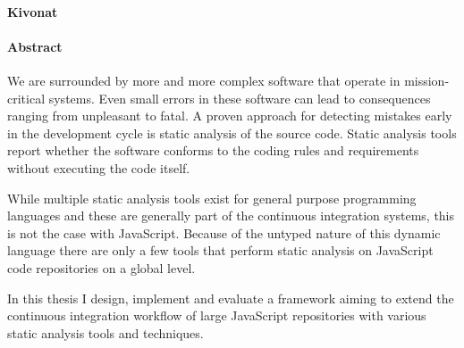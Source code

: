 \begin{otherlanguage}{magyar}

  \paragraph*{Kivonat}
  \thispagestyle{plain}
  {
  \selecthungarian



  }

\end{otherlanguage}

\cleardoublepage

\paragraph*{Abstract}
{}
\thispagestyle{plain}

We are surrounded by more and more complex software that operate in mission-critical systems. Even small errors in these software can lead to consequences ranging from unpleasant to fatal. A proven approach for detecting mistakes early in the development cycle is static analysis of the source code. Static analysis tools report whether the software conforms to the coding rules and requirements without executing the code itself.

While multiple static analysis tools exist for general purpose programming languages and these are generally part of the continuous integration systems, this is not the case with JavaScript. Because of the untyped nature of this dynamic language there are only a few tools that perform static analysis on JavaScript code repositories on a global level.

In this thesis I design, implement and evaluate a framework aiming to extend the continuous integration workflow of large JavaScript repositories with various static analysis tools and techniques.

\clearpage
